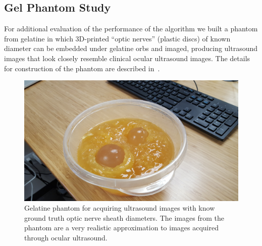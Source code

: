 \documentclass{llncs}
\begin{document}
\subsection{Gel Phantom Study}
For additional evaluation of the performance of the algorithm we built a
phantom from gelatine in which 3D-printed “optic nerves” (plastic discs) of
known diameter can be embedded under gelatine orbs and imaged, producing
ultrasound images that look closely resemble clinical ocular ultrasound images.
The details for construction of the phantom are described in~\cite{Ze2014}.
\begin{figure}
\centering
\includegraphics[width=0.85\linewidth]{phantom.jpg} 
\caption{
\label{fig:phantom}
Gelatine phantom for acquiring ultrasound images with know ground truth optic
nerve sheath diameters. The images from the phantom are a very realistic
approximation to images acquired through ocular ultrasound. 
}
\end{figure}
\end{document}

